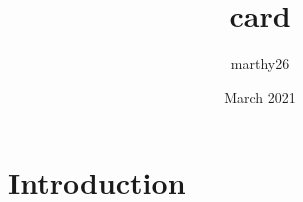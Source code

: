 \documentclass{article}
\title{card}
\author{marthy26 }
\date{March 2021}
\begin{document}
\maketitle

\section{Introduction}
\end{document}
